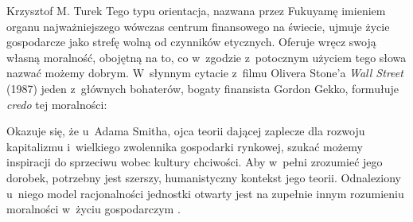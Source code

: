 \begin{artplenv}{Krzysztof M. Turek}
Tego typu orientacja, nazwana przez Fukuyamę imieniem organu najważniejszego wówczas centrum finansowego na świecie,
ujmuje życie gospodarcze jako strefę wolną od czynników etycznych. Oferuje wręcz swoją własną moralność, obojętną na
to, co w~zgodzie z~potocznym użyciem tego słowa nazwać możemy dobrym. W~słynnym cytacie z~filmu Olivera Stone'a
\textit{Wall Street} (1987) jeden z~głównych bohaterów, bogaty finansista Gordon Gekko, formułuje \textit{credo} tej
moralności: 


Okazuje się, że u~Adama Smitha, ojca teorii dającej zaplecze dla rozwoju kapitalizmu i~wielkiego zwolennika gospodarki
rynkowej, szukać możemy inspiracji do sprzeciwu wobec kultury chciwości. Aby w~pełni zrozumieć jego dorobek, potrzebny
jest szerszy, humanistyczny kontekst jego teorii. Odnaleziony u~niego model racjonalności jednostki otwarty jest na
zupełnie innym rozumieniu moralności w~życiu gospodarczym
\parencite[zob. np.][]{przybyla_adam_2006}.


\end{artplenv}
